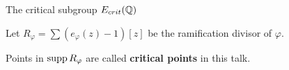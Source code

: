 \documentclass[handout]{beamer}
\begin{document}
\begin{frame}{The critical subgroup $E_{crit}(\mathbb{Q})$}









Let $R_\varphi =  \sum (e_\varphi(z)  -1) [z]$ be the ramification divisor of $\varphi$.

\smallskip

Points in $\operatorname{supp} R_{\varphi}$ are called {\bf critical points} in this talk.


\end{frame}
\end{document}
